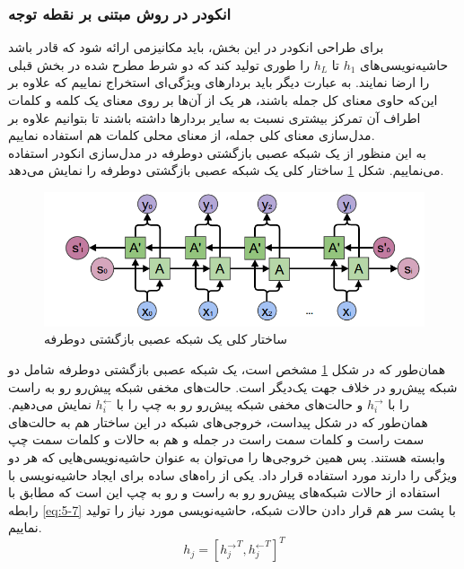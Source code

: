 \subsubsection{انکودر در روش مبتنی بر نقطه توجه}
برای طراحی انکودر در این بخش، باید مکانیزمی ارائه شود که قادر باشد حاشیه‌نویسی‌های $h_1$ تا $h_L$ را طوری تولید کند که دو شرط مطرح شده در بخش قبلی را ارضا نمایند. به عبارت دیگر باید بردارهای ویژگی‌ای استخراج نماییم که علاوه بر این‌که حاوی معنای کل جمله باشند، هر یک از آن‌ها بر روی معنای یک کلمه و کلمات اطراف آن تمرکز بیشتری نسبت به سایر بردارها داشته باشند تا بتوانیم علاوه بر مدل‌سازی معنای کلی جمله، از معنای محلی کلمات هم استفاده نماییم.
\\
به این منظور از یک شبکه عصبی بازگشتی دوطرفه در مدل‌سازی انکودر استفاده می‌نماییم. شکل \ref{fig:biencoder} ساختار کلی یک شبکه عصبی بازگشتی دوطرفه را نمایش می‌دهد. 

\begin{figure}[h]
\centering
\includegraphics[scale=0.6]{Imgs/biencoder.png}
\caption{ساختار کلی یک شبکه عصبی بازگشتی دوطرفه}
\label{fig:biencoder}
\end{figure}

همان‌طور که در شکل \ref{fig:biencoder} مشخص است، یک شبکه عصبی بازگشتی دوطرفه شامل دو شبکه پیش‌رو در خلاف جهت یک‌دیگر است. حالت‌های مخفی شبکه پیش‌رو رو به راست را با $h_i^\rightarrow$ و حالت‌های مخفی شبکه پیش‌رو رو به چپ را با $h_i^\leftarrow$ نمایش می‌دهیم. همان‌طور که در شکل پیداست، خروجی‌های شبکه در این ساختار هم به حالت‌های سمت راست و کلمات سمت راست در جمله و هم به حالات و کلمات سمت چپ وابسته هستند. پس همین خروجی‌ها را می‌توان به عنوان حاشیه‌نویسی‌هایی که هر دو ویژگی را دارند مورد استفاده قرار داد.
	یکی از راه‌های ساده برای ایجاد حاشیه‌نویسی با استفاده از حالات شبکه‌های پیش‌رو رو به راست و رو به چپ این است که مطابق با رابطه \eqref{eq:5-7} با پشت سر هم قرار دادن حالات شبکه، حاشیه‌نویسی مورد نیاز را تولید نماییم.
	\begin{equation}
	h_j = [{h_j^\rightarrow}^T, {h_j^\leftarrow}^T]^T
	\label{eq:5-7}
	\end{equation}











